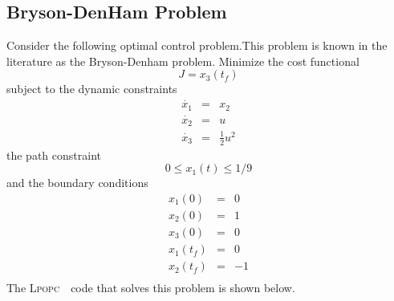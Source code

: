 \documentclass[10pt]{article}
\newcommand{\LPOPC}{\textsc{Lpopc}\xspace}
\begin{document}
	\clearpage
	\subsection{Bryson-DenHam Problem}
	Consider the following optimal control problem.This problem is known in the literature as the Bryson-Denham problem\cite{bryson1969energy}.  Minimize the cost functional
	\begin{equation}
	J = x_3(t_f)
	\end{equation}
	subject to the dynamic constraints
	\begin{equation}
	\begin{array}{lcl}
	\dot{x_1} & = & x_2 \\
	\dot{x_2} & = & u \\
	\dot{x_3} & = & \frac{1}{2}u^2
	\end{array}
	\end{equation}
	the path constraint
	\begin{equation}
	0 \leq x_1(t) \leq 1/9
	\end{equation}
	and the boundary conditions
	\begin{equation}
	\begin{array}{lcl}
	x_1(0) & = & 0 \\
	x_2(0) & = & 1 \\
	x_3(0) & = & 0 \\
	x_1(t_f) & = & 0 \\
	x_2(t_f) & = & -1 \\
	\end{array}
	\end{equation}
	The \LPOPC　code that solves this problem is shown below.\\
	
	
\end{document}
